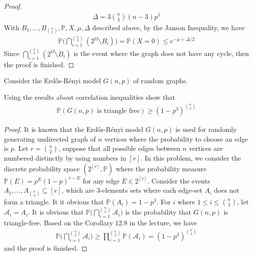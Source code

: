 \begin{proof}
  \begin{align*}
    \Delta = 3 \binom{n}{3} (n-3) p^{5}
  \end{align*}
  With $B_{1}, \ldots, B_{\binom{n}{3}}, \mathbb{P}, X, \mu, \Delta$ described above, by the Janson Inequality, we have
  \begin{align*}
    \mathbb{P} \Big(\bigcap_{i=1}^{\binom{n}{3}} (2^{\Omega} \setminus B_{i}) \Big) = \mathbb{P}(X=0) \leq e^{-\mu + \Delta/2}
  \end{align*}
  Since $\bigcap\limits_{i=1}^{\binom{n}{3}} (2^{\Omega} \setminus B_{i})$ is the event where the graph does not have any cycle, then the proof is finished.
\end{proof}

\begin{problem}
  Consider the Erdős-Rényi model $G(n,p)$ of random graphs. 

  Using the results about correlation inequalities show that
  \begin{align*}
    \mathbb{P}(G(n,p) \text{ is triangle free}) \geq (1-p^{3})^{\binom{n}{3}}
  \end{align*}
\end{problem}
\begin{proof}
  It is known that the Erdős-Rényi model $G(n,p)$ is used for randomly generating undirected graph of $n$ vertices where the probability to choose an edge is $p$. Let $r = \binom{n}{2}$, suppose that all possible edges between $n$ vertices are numbered distinctly by using numbers in $[r]$. In this problem, we consider the discrete probability space $(2^{[r]}, \mathbb{P})$ where the probability measure $\mathbb{P}(E) = p^{E}(1-p)^{r-E}$ for any edge $E \in 2^{[r]}$. Consider the events $A_{1}, \ldots, A_{\binom{n}{3}} \subseteq [r]$, which are $3$-elements sets where each edge-set $A_{i}$ does not form a triangle. It it obvious that $\mathbb{P}(A_{i}) = 1 - p^{3}$. For $i$ where $1 \leq i \leq \binom{n}{3}$, let $\mathcal{A}_{i} = A_{i}$. It is obvious that $\mathbb{P} \Big( \bigcap\limits_{i=1}^{\binom{n}{3}} \mathcal{A}_{i} \Big)$ is the probability that $G(n,p)$ is triangle-free. Based on the Corollary $12.8$ in the lecture, we have
  \begin{align*}
    \mathbb{P} \Big(\bigcap\limits_{i=1}^{\binom{n}{3}} \mathcal{A}_{i} \Big) \geq \prod\limits_{i=1}^{\binom{n}{3}} \mathbb{P}(\mathcal{A}_{i}) = (1-p^{3})^{\binom{n}{3}}
  \end{align*}
  and the proof is finished.
\end{proof}

